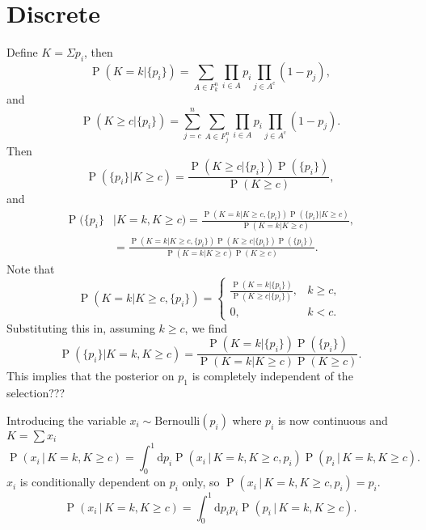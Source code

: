 \documentclass[fleqn,usenatbib]{mnras}
\begin{document}
\section{Discrete}
Define $K=\Sigma p_i$, then
\begin{equation}
\operatorname{P}(K=k|\{p_i\}) = \sum_{A\in F_k^n} \prod_{i\in A} p_i \prod_{j\in A^{\mathrm{c}}} (1-p_j),
\end{equation}
and 
\begin{equation}
\operatorname{P}(K\geq c|\{p_i\}) = \sum_{j=c}^{n}\sum_{A\in F_j^n} \prod_{i\in A} p_i \prod_{j\in A^{\mathrm{c}}} (1-p_j).
\end{equation}
Then
\begin{equation}
    \operatorname{P}(\{p_i\}|K\geq c) = \frac{\operatorname{P}(K\geq c | \{p_i\}) \operatorname{P}(\{p_i\}) }{\operatorname{P}(K\geq c) },
\end{equation}
and 
\begin{align}
    \operatorname{P}(\{p_i\}&|K=k,K\geq c) = \frac{\operatorname{P}(K=k | K\geq c,\{p_i\}) \operatorname{P}(\{p_i\}|K\geq c) }{\operatorname{P}(K=k|K\geq c) }, \\
    &= \frac{\operatorname{P}(K=k | K\geq c,\{p_i\}) \operatorname{P}(K\geq c | \{p_i\}) \operatorname{P}(\{p_i\}) }{\operatorname{P}(K=k|K\geq c)\operatorname{P}(K\geq c) }.
\end{align}
Note that
\begin{equation}
    \operatorname{P}(K=k | K\geq c,\{p_i\}) = \begin{cases}
\frac{\operatorname{P}(K=k | \{p_i\})}{\operatorname{P}(K\geq c|\{p_i\})}, & k\geq c,\\
0, & k<c.
\end{cases}
\end{equation}
Substituting this in, assuming $k\geq c$, we find
\begin{equation}
    \operatorname{P}(\{p_i\}|K=k,K\geq c) = \frac{\operatorname{P}(K=k | \{p_i\}) \operatorname{P}(\{p_i\}) }{\operatorname{P}(K=k|K\geq c)\operatorname{P}(K\geq c) }.
\end{equation}
This implies that the posterior on $p_1$ is completely independent of the selection???


Introducing the variable $x_i \sim \mathrm{Bernoulli}(p_i)$ where $p_i$ is now continuous and $K=\sum x_i$
\begin{equation}
    \operatorname{P}(x_i \,|\,K=k, K\geq c)  = \int_0^1 \mathrm{d}p_i \operatorname{P}(x_i\,|\,K=k, K\geq c, p_i) \operatorname{P}(p_i \,|\,K=k, K\geq c).
\end{equation}
$x_i$ is conditionally dependent on $p_i$ only, so $\operatorname{P}(x_i\,|\,K=k, K\geq c, p_i) = p_i$. 
\begin{equation}
    \operatorname{P}(x_i \,|\,K=k, K\geq c)  = \int_0^1 \mathrm{d}p_i p_i \operatorname{P}(p_i \,|\,K=k, K\geq c).
\end{equation}




\bsp	%
\label{lastpage}
\end{document}
